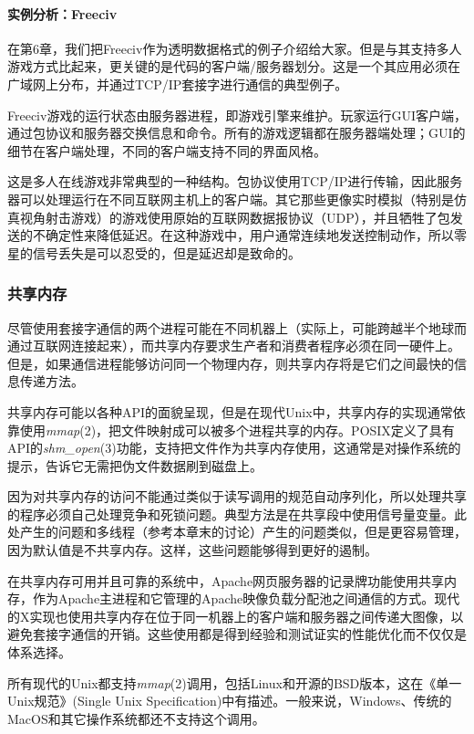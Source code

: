 \documentclass[12pt,oneside]{book}
\begin{document}
\paragraph{实例分析：Freeciv}
在第6章，我们把Freeciv作为透明数据格式的例子介绍给大家。但是与其支持多人游戏方式比起来，更关键的是代码的客户端/服务器划分。这是一个其应用必须在广域网上分布，并通过TCP/IP套接字进行通信的典型例子。

Freeciv游戏的运行状态由服务器进程，即游戏引擎来维护。玩家运行GUI客户端，通过包协议和服务器交换信息和命令。所有的游戏逻辑都在服务器端处理；GUI的细节在客户端处理，不同的客户端支持不同的界面风格。

这是多人在线游戏非常典型的一种结构。包协议使用TCP/IP进行传输，因此服务器可以处理运行在不同互联网主机上的客户端。其它那些更像实时模拟（特别是仿真视角射击游戏）的游戏使用原始的互联网数据报协议（UDP），并且牺牲了包发送的不确定性来降低延迟。在这种游戏中，用户通常连续地发送控制动作，所以零星的信号丢失是可以忍受的，但是延迟却是致命的。


\subsubsection{共享内存}
尽管使用套接字通信的两个进程可能在不同机器上（实际上，可能跨越半个地球而通过互联网连接起来），而共享内存要求生产者和消费者程序必须在同一硬件上。但是，如果通信进程能够访问同一个物理内存，则共享内存将是它们之间最快的信息传递方法。

共享内存可能以各种API的面貌呈现，但是在现代Unix中，共享内存的实现通常依靠使用\textit{mmap}(2)，把文件映射成可以被多个进程共享的内存。POSIX定义了具有API的\textit{shm\_{}open}(3)功能，支持把文件作为共享内存使用，这通常是对操作系统的提示，告诉它无需把伪文件数据刷到磁盘上。

因为对共享内存的访问不能通过类似于读写调用的规范自动序列化，所以处理共享的程序必须自己处理竞争和死锁问题。典型方法是在共享段中使用信号量变量。此处产生的问题和多线程（参考本章末的讨论）产生的问题类似，但是更容易管理，因为默认值是不共享内存。这样，这些问题能够得到更好的遏制。

在共享内存可用并且可靠的系统中，Apache网页服务器的记录牌功能使用共享内存，作为Apache主进程和它管理的Apache映像负载分配池之间通信的方式。现代的X实现也使用共享内存在位于同一机器上的客户端和服务器之间传递大图像，以避免套接字通信的开销。这些使用都是得到经验和测试证实的性能优化而不仅仅是体系选择。

所有现代的Unix都支持\textit{mmap}(2)调用，包括Linux和开源的BSD版本，这在《单一Unix规范》(Single Unix Specification)中有描述。一般来说，Windows、传统的MacOS和其它操作系统都还不支持这个调用。
\end{document}
